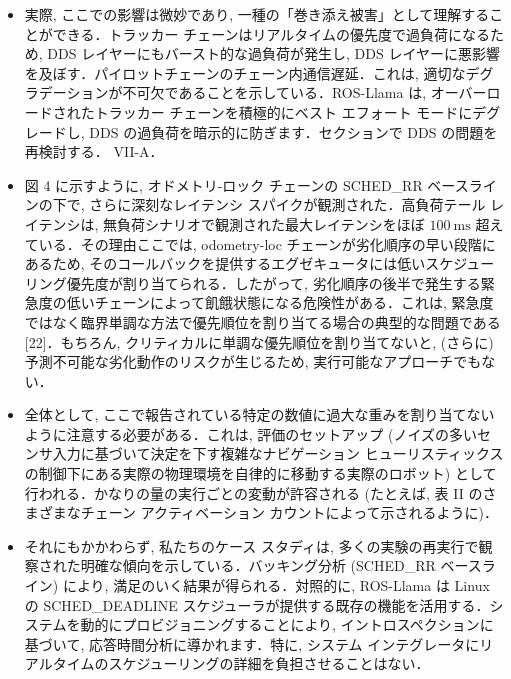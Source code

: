\begin{frame}{}
    \begin{itemize}
        \item 実際, ここでの影響は微妙であり, 一種の「巻き添え被害」として理解することができる．トラッカー チェーンはリアルタイムの優先度で過負荷になるため, DDS レイヤーにもバースト的な過負荷が発生し, DDS レイヤーに悪影響を及ぼす．パイロットチェーンのチェーン内通信遅延．これは, 適切なデグラデーションが不可欠であることを示している．ROS-Llama は, オーバーロードされたトラッカー チェーンを積極的にベスト エフォート モードにデグレードし, DDS の過負荷を暗示的に防ぎます．セクションで DDS の問題を再検討する． VII-A．
    \end{itemize}
\end{frame}

\begin{frame}{}
    \begin{itemize}
        \item 図 4 に示すように, オドメトリ-ロック チェーンの SCHED\_RR ベースラインの下で, さらに深刻なレイテンシ スパイクが観測された．高負荷テール レイテンシは, 無負荷シナリオで観測された最大レイテンシをほぼ $100 \mathrm{~ms}$ 超えている．その理由ここでは, odometry-loc チェーンが劣化順序の早い段階にあるため, そのコールバックを提供するエグゼキュータには低いスケジューリング優先度が割り当てられる．したがって, 劣化順序の後半で発生する緊急度の低いチェーンによって飢餓状態になる危険性がある．これは, 緊急度ではなく臨界単調な方法で優先順位を割り当てる場合の典型的な問題である [22]．もちろん, クリティカルに単調な優先順位を割り当てないと, (さらに) 予測不可能な劣化動作のリスクが生じるため, 実行可能なアプローチでもない．
    \end{itemize}
\end{frame}

\begin{frame}{}
    \begin{itemize}
        \item 全体として, ここで報告されている特定の数値に過大な重みを割り当てないように注意する必要がある．これは, 評価のセットアップ (ノイズの多いセンサ入力に基づいて決定を下す複雑なナビゲーション ヒューリスティックスの制御下にある実際の物理環境を自律的に移動する実際のロボット) として行われる．かなりの量の実行ごとの変動が許容される (たとえば, 表 II のさまざまなチェーン アクティベーション カウントによって示されるように)．
    \end{itemize}
\end{frame}

\begin{frame}{}
    \begin{itemize}
        \item それにもかかわらず, 私たちのケース スタディは, 多くの実験の再実行で観察された明確な傾向を示している．バッキング分析 (SCHED\_RR ベースライン) により, 満足のいく結果が得られる．対照的に, ROS-Llama は Linux の SCHED\_DEADLINE スケジューラが提供する既存の機能を活用する．システムを動的にプロビジョニングすることにより, イントロスペクションに基づいて, 応答時間分析に導かれます．特に, システム インテグレータにリアルタイムのスケジューリングの詳細を負担させることはない．
    \end{itemize}
\end{frame}


